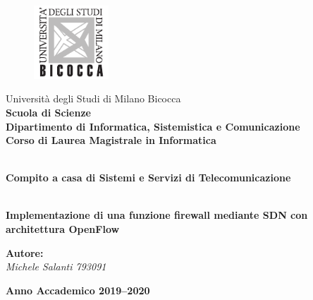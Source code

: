 \begin{titlepage}
\begin{onehalfspace}
	\begin{figure}
		\vspace*{-7mm}
		\centering
		\includegraphics[width=0.25\textwidth]{img/logo_unimib.pdf}
	\end{figure}
	\par
	\noindent Università degli Studi di Milano Bicocca \\
	\textbf{Scuola di Scienze \\
			Dipartimento di Informatica, Sistemistica e Comunicazione \\
			Corso di Laurea Magistrale in Informatica}
\end{onehalfspace}

\vfill
\par

\begin{doublespace}
\begin{center}
	{\Huge \textbf{\\Compito a casa di Sistemi e Servizi di Telecomunicazione}}
\end{center}
\begin{center}
	{\Large \textbf{\\Implementazione di una funzione firewall mediante SDN con architettura OpenFlow}}
\end{center}
\end{doublespace}

\vfill
\par

\begin{onehalfspace}

\vspace{8mm}
\par

\begin{flushright}
	{\large \textbf{Autore:} \\
			\textit{Michele Salanti 793091}
	}
\end{flushright}
\end{onehalfspace}

\vfill
\par

\begin{center}
	{\large \textbf{Anno Accademico 2019--2020}}
\end{center}

\end{titlepage}
